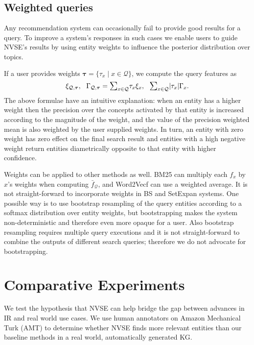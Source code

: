 \documentclass[a4paper]{article}
\newcommand{\Todo}[2][red]{\todo[]{\textcolor{#1}{\footnotesize #2}}}
\newcommand{\cQ}{\mathcal{Q}}
\newcommand{\cR}{\mathcal{R}}
\newcommand{\fcq}{\bar{f}_\cQ}
\newcommand{\btau}{{\boldsymbol\tau}}
\newcommand{\sumc}{\raisebox{-0.7ex}{$\mathlarger{\mathlarger{\mathlarger{\mathlarger{\Sigma}}}}$}}
\newcommand{\wTv}{Word2Vecf\xspace}
\newcommand{\setX}{SetExpan\xspace}
\newcommand{\nvge}{NVSE\xspace}
\newcommand{\mycite}[1]{\cite{#1}}%
\begin{document}
\subsection{Weighted queries}
Any recommendation system can occasionally fail to provide good results for a query. To improve a %
system's responses in such cases we enable users to guide \nvge's results 
by using entity weights to influence the posterior distribution over topics.  

If a user provides weights
$\btau = \{ \tau_x \mid x \in \cQ\}$, we compute the query features as
\begin{equation}\label{eq:weight}
\xi_{\cQ,\btau},\ \ \Gamma_{\cQ,\btau} = \sumc_{x \in \cQ} \tau_x \xi_x,\ \ \sumc_{x \in \cQ} |\tau_x|\Gamma_x.
\end{equation}
The above formulae have an intuitive explanation:
 when an entity has a higher weight then the precision over the concepts activated by that entity is increased according to the magnitude of the weight, and the value of the precision weighted mean is also weighted by the user supplied weights. 
In turn, an entity with zero weight has zero effect on the final search result and entities with a high negative weight return entities diametrically opposite to that entity with higher confidence.

Weights can be applied to other methods as well. 
BM25 %
can multiply each
$f_x$ by $x$'s weights when computing $\fcq$,
and \wTv can %
use a weighted average.
It is not straight-forward to incorporate weights in BS and \setX systems. One possible way is to use bootstrap resampling of the query entities according to a softmax distribution over entity weights, but bootstrapping makes the system non-deterministic and therefore even more opaque for a user. Also bootstrap resampling requires multiple query executions and it is not straight-forward to combine the outputs of different search queries; therefore we do not advocate for bootstrapping. %


\section{Comparative Experiments}
We test the hypothesis that \nvge can help bridge the gap between advances in IR and real world use cases. We use human annotators on Amazon Mechanical Turk (AMT) to determine whether \nvge finds more relevant entities than our baseline methods in a real world, automatically generated KG.
\end{document}
